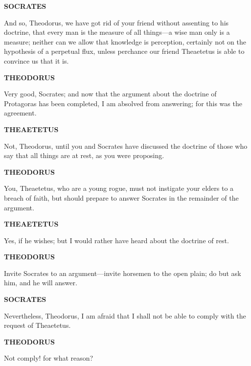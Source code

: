 \documentclass[11pt,letter]{article}
\begin{document}
\par \textbf{SOCRATES}
\par   And so, Theodorus, we have got rid of your friend without assenting to his doctrine, that every man is the measure of all things—a wise man only is a measure; neither can we allow that knowledge is perception, certainly not on the hypothesis of a perpetual flux, unless perchance our friend Theaetetus is able to convince us that it is.

\par \textbf{THEODORUS}
\par   Very good, Socrates; and now that the argument about the doctrine of Protagoras has been completed, I am absolved from answering; for this was the agreement.

\par \textbf{THEAETETUS}
\par   Not, Theodorus, until you and Socrates have discussed the doctrine of those who say that all things are at rest, as you were proposing.

\par \textbf{THEODORUS}
\par   You, Theaetetus, who are a young rogue, must not instigate your elders to a breach of faith, but should prepare to answer Socrates in the remainder of the argument.

\par \textbf{THEAETETUS}
\par   Yes, if he wishes; but I would rather have heard about the doctrine of rest.

\par \textbf{THEODORUS}
\par   Invite Socrates to an argument—invite horsemen to the open plain; do but ask him, and he will answer.

\par \textbf{SOCRATES}
\par   Nevertheless, Theodorus, I am afraid that I shall not be able to comply with the request of Theaetetus.

\par \textbf{THEODORUS}
\par   Not comply! for what reason?
\end{document}
